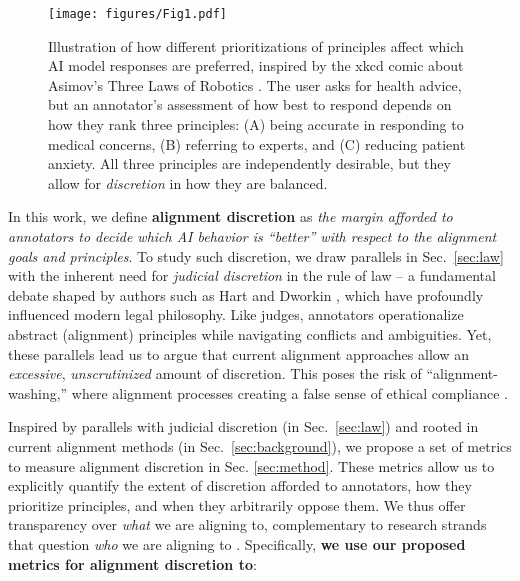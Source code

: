 \documentclass{article}
\begin{document}
\begin{figure}[t]
    \centering
    \texttt{[image: figures/Fig1.pdf]}
    \caption{Illustration of how different prioritizations of principles affect which AI model responses are preferred, inspired by the xkcd comic about Asimov’s Three Laws of Robotics \cite{xkcd1613}. The user asks for health advice, but an annotator's assessment of how best to respond depends on how they rank three principles: (A) being accurate in responding to medical concerns, (B) referring to experts, and (C) reducing patient anxiety. All three principles are independently desirable, but they allow for \textit{discretion} in how they are balanced.}
    \label{fig:1}
\end{figure}


In this work, we define \textbf{alignment discretion}
as \emph{the margin afforded to annotators 
to decide which AI behavior is ``better'' with respect to the alignment goals and principles}.
To study such discretion, we draw parallels in Sec.~\ref{sec:law} with the inherent need for \textit{judicial discretion} in the rule of law -- a fundamental debate shaped by authors such as Hart \cite{hart2012concept} and Dworkin \cite{dworkin1986law}, which have profoundly influenced modern legal philosophy. 
Like judges, annotators operationalize abstract (alignment) principles while navigating conflicts and ambiguities. 
Yet, these parallels lead us to argue that current alignment approaches allow an \textit{excessive}, \textit{unscrutinized} amount of discretion. 
This poses the risk of ``alignment-washing,'' where alignment processes 
creating a false sense of ethical compliance \cite{bietti2020ethics,casper2023open}. 


Inspired by parallels with judicial discretion (in Sec.~\ref{sec:law}) and rooted in current alignment methods (in Sec.~\ref{sec:background}), we propose a set of metrics to measure alignment discretion in Sec. \ref{sec:method}.
These metrics allow us to explicitly quantify the extent of discretion afforded to annotators, how they prioritize principles, and when they arbitrarily oppose them.
We thus offer transparency over \textit{what} we are aligning to, complementary to research strands that question \textit{who} we are aligning to \cite{atari2023humans,jainAlgorithmicPluralismStructural2024,klassen2024pluralistic,kirkprism}.
Specifically, \textbf{we use our proposed metrics for alignment discretion to}:
\end{document}
